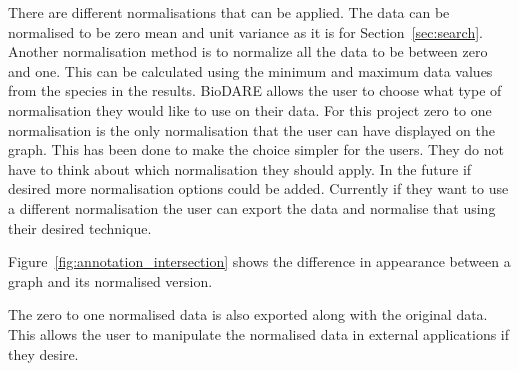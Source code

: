 There are different normalisations that can be applied.  The data can be normalised to be zero mean and unit variance as it is for Section~\ref{sec:search}.  Another normalisation method is to normalize all the data to be between zero and one. This can be calculated using the minimum and maximum data values from the species in the results.  BioDARE allows the user to choose what type of normalisation they would like to use on their data.  For this project zero to one normalisation is the only normalisation that the user can have displayed on the graph.  This has been done to make the choice simpler for the users.  They do not have to think about which normalisation they should apply.  In the future if desired more normalisation options could be added.  Currently if they want to use a different normalisation the user can export the data and normalise that using their desired technique.

Figure~\ref{fig:annotation_intersection} shows the difference in appearance between a graph and its normalised version.

The zero to one normalised data is also exported along with the original data.  This allows the user to manipulate the normalised data in external applications if they desire.

